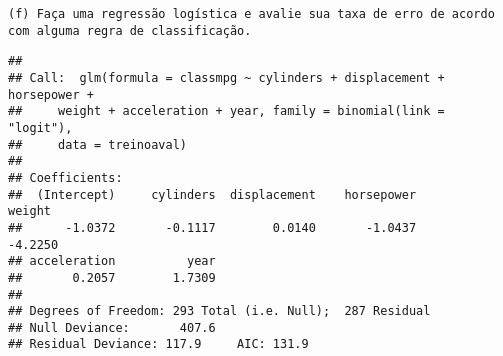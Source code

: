 \documentclass[]{article}
\newenvironment{Shaded}{\begin{snugshade}}{\end{snugshade}}
\newcommand{\KeywordTok}[1]{\textcolor[rgb]{0.13,0.29,0.53}{\textbf{#1}}}
\newcommand{\DataTypeTok}[1]{\textcolor[rgb]{0.13,0.29,0.53}{#1}}
\newcommand{\DecValTok}[1]{\textcolor[rgb]{0.00,0.00,0.81}{#1}}
\newcommand{\StringTok}[1]{\textcolor[rgb]{0.31,0.60,0.02}{#1}}
\newcommand{\OperatorTok}[1]{\textcolor[rgb]{0.81,0.36,0.00}{\textbf{#1}}}
\newcommand{\NormalTok}[1]{#1}
\begin{document}
\begin{verbatim}
(f) Faça uma regressão logística e avalie sua taxa de erro de acordo com alguma regra de classificação.
\end{verbatim}

\begin{Shaded}
\end{Shaded}

\begin{verbatim}
## 
## Call:  glm(formula = classmpg ~ cylinders + displacement + horsepower + 
##     weight + acceleration + year, family = binomial(link = "logit"), 
##     data = treinoaval)
## 
## Coefficients:
##  (Intercept)     cylinders  displacement    horsepower        weight  
##      -1.0372       -0.1117        0.0140       -1.0437       -4.2250  
## acceleration          year  
##       0.2057        1.7309  
## 
## Degrees of Freedom: 293 Total (i.e. Null);  287 Residual
## Null Deviance:       407.6 
## Residual Deviance: 117.9     AIC: 131.9
\end{verbatim}

\begin{Shaded}
\end{Shaded}
\end{document}
